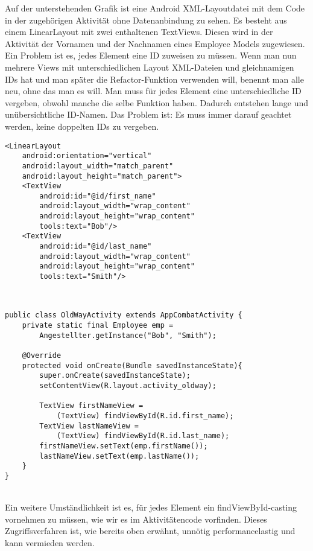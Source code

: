 \documentclass[FIPLY_base.tex]{subfiles}
\begin{document}
Auf der unterstehenden Grafik ist eine Android XML-Layoutdatei mit dem Code in der zugehörigen Aktivität ohne Datenanbindung zu sehen. Es besteht aus einem LinearLayout mit zwei enthaltenen TextViews. Diesen wird in der Aktivität der Vornamen und der Nachnamen eines Employee Models zugewiesen. Ein Problem ist es, jedes Element eine ID zuweisen zu müssen. Wenn man nun mehrere Views mit unterschiedlichen Layout XML-Dateien und gleichnamigen IDs hat und man später die Refactor-Funktion verwenden will, benennt man alle neu, ohne das man es will. Man muss für jedes Element eine unterschiedliche ID vergeben, obwohl manche die selbe Funktion haben. Dadurch entstehen lange und unübersichtliche ID-Namen. Das Problem ist: Es muss immer darauf geachtet werden, keine doppelten IDs zu vergeben.\\
\newpage
\begin{lstlisting}[caption={XML Datei vor dem Einsatz von Databinding.},label=DescriptiveLabel]
<LinearLayout
	android:orientation="vertical"
	android:layout_width="match_parent"
	android:layout_height="match_parent">
	<TextView
		android:id="@id/first_name"
		android:layout_width="wrap_content"
		android:layout_height="wrap_content"
		tools:text="Bob"/>
	<TextView
		android:id="@id/last_name"
		android:layout_width="wrap_content"
		android:layout_height="wrap_content"
		tools:text="Smith"/>	
\end{lstlisting}
\ \\

\begin{lstlisting}[caption={Die Activity vor dem Einsatz von DataBinding.},label=DescriptiveLabel]
public class OldWayActivity extends AppCombatActivity {
	private static final Employee emp = 
		Angestellter.getInstance("Bob", "Smith");
	
	@Override
	protected void onCreate(Bundle savedInstanceState){
		super.onCreate(savedInstanceState);
		setContentView(R.layout.activity_oldway);
		
		TextView firstNameView = 
			(TextView) findViewById(R.id.first_name);
		TextView lastNameView = 
			(TextView) findViewById(R.id.last_name);
		firstNameView.setText(emp.firstName());
		lastNameView.setText(emp.lastName());
	}
}
\end{lstlisting}
\ \\
Ein weitere Umständlichkeit ist es, für jedes Element ein findViewById-casting vornehmen zu müssen, wie wir es im Aktivitätencode vorfinden. Dieses Zugriffsverfahren ist, wie bereits oben erwähnt, unnötig performancelastig und kann vermieden werden.
\end{document}
